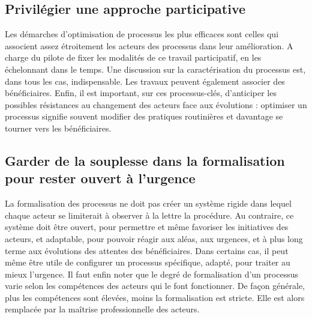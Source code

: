  \subsection{Privilégier une approche participative  }
 Les démarches d'optimisation de processus les plus efficaces sont celles qui associent assez étroitement les acteurs des processus dans leur amélioration. A charge du pilote de fixer les modalités de ce travail participatif, en les échelonnant dans le temps. Une discussion sur la caractérisation du processus est, dans tous les cas, indispensable. Les travaux peuvent également associer des bénéficiaires. Enfin, il est important, sur ces processus-clés, d'anticiper les possibles résistances au changement des acteurs face aux évolutions : optimiser un processus signifie souvent modifier des pratiques routinières et davantage se tourner vers les bénéficiaires.
 \subsection{Garder de la souplesse dans la formalisation pour rester ouvert à l’urgence  }
 La formalisation des processus ne doit pas créer un système rigide dans lequel chaque acteur se limiterait à observer à la lettre la procédure. Au contraire, ce système doit être ouvert, pour permettre et même favoriser les initiatives des acteurs, et adaptable, pour pouvoir réagir aux aléas, aux urgences, et à plus long terme aux évolutions des attentes des bénéficiaires. Dans certains cas, il peut même être utile de configurer un processus spécifique, adapté, pour traiter au mieux l'urgence. 
Il faut enfin noter que le degré de formalisation d'un processus varie selon les compétences des acteurs qui le font fonctionner. De façon générale, plus les compétences sont élevées, moins la formalisation est stricte. Elle est alors remplacée par la maîtrise professionnelle des acteurs.



